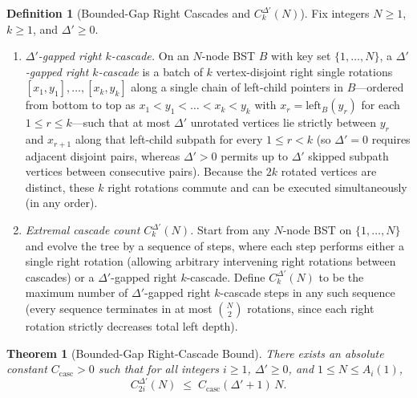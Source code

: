 \documentclass[11pt]{article}
\newtheorem{theorem}{Theorem}[section]
\theoremstyle{definition}
\newtheorem*{definition*}{Definition}
\theoremstyle{remark}
\begin{document}
\begin{definition*}[Bounded-Gap Right Cascades and $C^{\Delta'}_k(N)$]
Fix integers $N \ge 1$, $k \ge 1$, and $\Delta' \ge 0$.
\begin{enumerate}[label=(\arabic*), leftmargin=2em, itemsep=2pt]
  \item \emph{$\Delta'$-gapped right $k$-cascade.} On an $N$-node BST $B$ with key set $\{1, \dots, N\}$, a \emph{$\Delta'$-gapped right $k$-cascade} is a batch of $k$ vertex-disjoint right single rotations $[x_1, y_1], \dots, [x_k, y_k]$ along a single chain of left-child pointers in $B$---ordered from bottom to top as $x_1 < y_1 < \dots < x_k < y_k$ with $x_r = \mathrm{left}_B(y_r)$ for each $1 \le r \le k$---such that at most $\Delta'$ unrotated vertices lie strictly between $y_r$ and $x_{r+1}$ along that left-child subpath for every $1 \le r < k$ (so $\Delta' = 0$ requires adjacent disjoint pairs, whereas $\Delta' > 0$ permits up to $\Delta'$ skipped subpath vertices between consecutive pairs). Because the $2k$ rotated vertices are distinct, these $k$ right rotations commute and can be executed simultaneously (in any order).
  \item \emph{Extremal cascade count $C^{\Delta'}_k(N)$.} Start from any $N$-node BST on $\{1, \dots, N\}$ and evolve the tree by a sequence of steps, where each step performs either a single right rotation (allowing arbitrary intervening right rotations between cascades) or a $\Delta'$-gapped right $k$-cascade. Define $C^{\Delta'}_k(N)$ to be the maximum number of $\Delta'$-gapped right $k$-cascade steps in any such sequence (every sequence terminates in at most $\binom{N}{2}$ rotations, since each right rotation strictly decreases total left depth).
\end{enumerate}
\end{definition*}

\begin{theorem}[Bounded-Gap Right-Cascade Bound]
\label{thm:mod2-cascade}
There exists an absolute constant $C_{\mathrm{casc}} > 0$ such that for all integers $i \ge 1$, $\Delta' \ge 0$, and $1 \le N \le A_i(1)$,
\[
C^{\Delta'}_{2i}(N) \;\le\; C_{\mathrm{casc}}(\Delta' + 1)\,N.
\]
\end{theorem}
\end{document}
